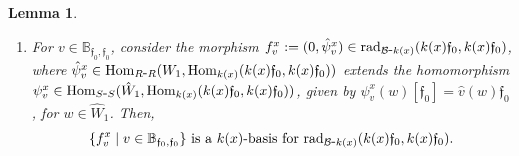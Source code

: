\documentclass{article}
\newtheorem{lemma}[theorem]{Lemma}
\theoremstyle{definition}
\newcommand{\Hom}{{ \rm Hom }}
\newcommand{\rad}{{ \rm rad }}
\renewcommand{\frak}{\mathfrak}
\newcommand{\g}{\hbox{-}}
\newcommand{\hueca}[1]{\mathbb{#1}}
\begin{document}
\begin{lemma}
\begin{enumerate}
$$\{f^x_v\mid v\in 
\hueca{B}_{\frak{f}_0,\frak{f}}\}\hbox{ is a $k(x)$-basis for }\rad_{{\cal B}\g k(x)}(S^x_{\frak{f}},k(x)\frak{f}_0).$$ 
 \item For  
 $v\in \hueca{B}_{\frak{f}_0,\frak{f}_0}$, consider the morphism  $f^x_v:=(0,\hat{\psi}^x_v)\in \rad_{{\cal B}\g k(x)}(k(x)\frak{f}_0,k(x)\frak{f}_0)$, where
 $\hat{\psi}^x_v\in \Hom_{R\g R}(W_1,\Hom_{k(x)}(k(x)\frak{f}_0,k(x)\frak{f}_0))$ extends the homomorphism  $\psi^x_v\in \Hom_{S\g S}(\hat{W}_1,\Hom_{k(x)}(k(x)\frak{f}_0,k(x)\frak{f}_0))$, given by  $\psi^x_v(w)[\frak{f}_0]=\hat{v}(w)\frak{f}_0$, for $w\in \hat{W}_1$. Then,  
$$\{f^x_v\mid v\in \hueca{B}_{\frak{f}_0,\frak{f}_0}\}\hbox{ is a $k(x)$-basis for }
\rad_{{\cal B}\g k(x)}(k(x)\frak{f}_0,k(x)\frak{f}_0).$$  
\end{enumerate}
\end{lemma}
\end{document}
